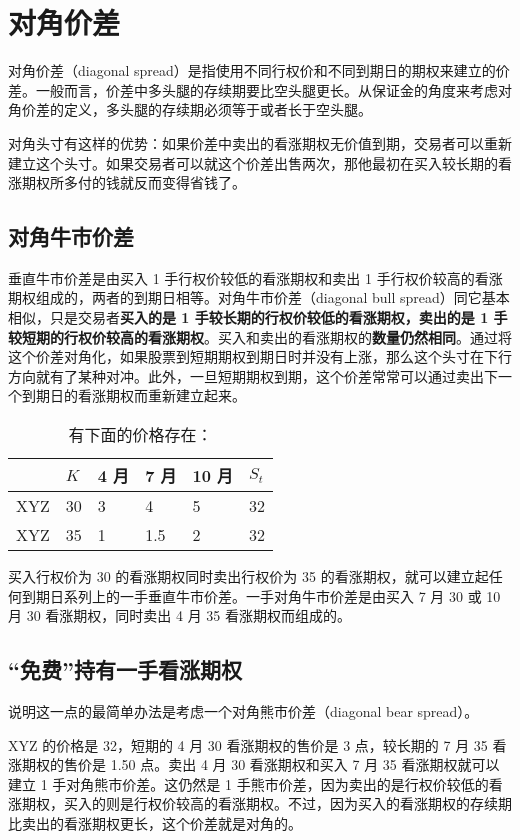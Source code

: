 \chapter{对角价差\label{CH:Diagonalizing a Spread}}
对角价差（diagonal spread）是指使用不同行权价和不同到期日的期权来建立的价差。一般而言，价差中多头腿的存续期要比空头腿更长。从保证金的角度来考虑对角价差的定义，多头腿的存续期必须等于或者长于空头腿。

对角头寸有这样的优势：如果价差中卖出的看涨期权无价值到期，交易者可以重新建立这个头寸。如果交易者可以就这个价差出售两次，那他最初在买入较长期的看涨期权所多付的钱就反而变得省钱了。

\section{对角牛市价差}
垂直牛市价差是由买入 1 手行权价较低的看涨期权和卖出 1 手行权价较高的看涨期权组成的，两者的到期日相等。对角牛市价差（diagonal bull spread）同它基本相似，只是交易者\textbf{买入的是 1 手较长期的行权价较低的看涨期权，卖出的是 1 手较短期的行权价较高的看涨期权}。买入和卖出的看涨期权的\textbf{数量仍然相同}。通过将这个价差对角化，如果股票到短期期权到期日时并没有上涨，那么这个头寸在下行方向就有了某种对冲。此外，一旦短期期权到期，这个价差常常可以通过卖出下一个到期日的看涨期权而重新建立起来。

\begin{table}[!ht]
    \centering
    \caption{有下面的价格存在：}
    \begin{tabular}{llllll}
        \hline
            & $K$ & 4 月 & 7 月 & 10 月 & $S_t$ \\ \hline
        XYZ & 30  & 3   & 4   & 5    & 32    \\
        XYZ & 35  & 1   & 1.5 & 2    & 32    \\ \hline
    \end{tabular}
\end{table}

买入行权价为 30 的看涨期权同时卖出行权价为 35 的看涨期权，就可以建立起任何到期日系列上的一手垂直牛市价差。一手对角牛市价差是由买入 7 月 30 或 10 月 30 看涨期权，同时卖出 4 月 35 看涨期权而组成的。

\section{“免费”持有一手看涨期权}
说明这一点的最简单办法是考虑一个对角熊市价差（diagonal bear spread）。
\begin{tcolorbox}
    XYZ 的价格是 32，短期的 4 月 30 看涨期权的售价是 3 点，较长期的 7 月 35 看涨期权的售价是 1.50 点。卖出 4 月 30 看涨期权和买入 7 月 35 看涨期权就可以建立 1 手对角熊市价差。这仍然是 1 手熊市价差，因为卖出的是行权价较低的看涨期权，买入的则是行权价较高的看涨期权。不过，因为买入的看涨期权的存续期比卖出的看涨期权更长，这个价差就是对角的。
\end{tcolorbox}

